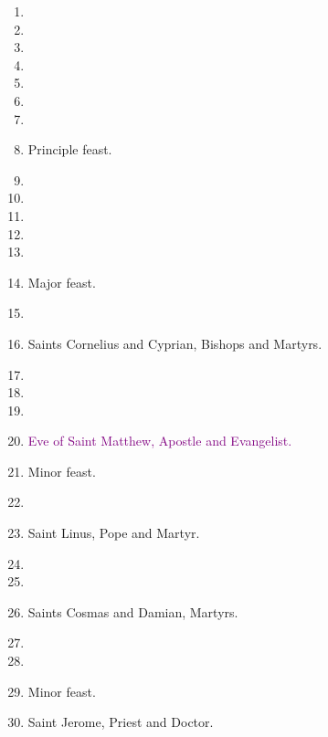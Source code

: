 	\pagebreak[1]

	
		\begin{enumerate}
			\item %
			\item %
			\item %
			\item %
			\item %
			\item %
			\item %
			\item {} Principle feast.
			\item %
			\item %
			\item %
			\item %
			\item %
			\item {} Major feast.
			\item %
			\item Saints Cornelius and Cyprian, Bishops and Martyrs. 
			\item %
			\item %
			\item %
			\item \textcolor{purple}{Eve of Saint Matthew, Apostle and Evangelist.}
			\item {} Minor feast.
			\item %
			\item Saint Linus, Pope and Martyr. 
			\item %
			\item %
			\item Saints Cosmas and Damian, Martyrs. 
			\item %
			\item %
			\item {} Minor feast.
			\item Saint Jerome, Priest and Doctor. 
		\end{enumerate}
	
	\pagebreak[1]


